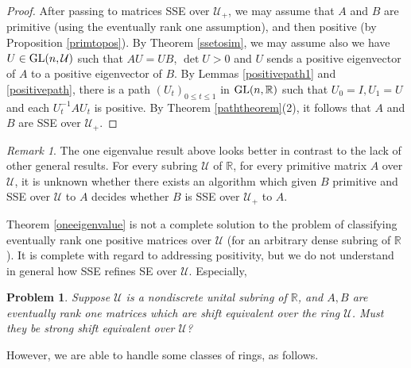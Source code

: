 \documentclass{amsart}
\newtheorem{problem}[theorem]{Problem}
\theoremstyle{definition}
\theoremstyle{remark}
\newtheorem{remark}[theorem]{Remark}
\numberwithin{equation}{section}
\begin{document}
{{\begin{proof}
After passing to matrices SSE over $\mathcal U_+$, 
we may assume that $A$ and $B$ are 
primitive (using the eventually rank one assumption),  
and then positive (by 
 Proposition \ref{primtopos}). By Theorem \ref{ssetosim}, 
we may assume also we have $U\in \textnormal{GL}(n,\mathcal U)$ 
such that $AU=UB$, $\det U>0$ and $U$ sends a positive 
eigenvector of $A$ to a positive eigenvector of $B$. 
By Lemmas \ref{positivepath1} and \ref{positivepath}, 
there is a path $( U_t)_{0\leq t\leq 1}$
in $\textnormal{GL}(n,\mathbb R)$ such that 
$U_0=I, U_1=U$ and each $U_t^{-1}AU_t$ is positive. 
By Theorem \ref{paththeorem}(2), it follows that 
$A$ and $B$ are SSE over $\mathcal U_+$. 
\end{proof} 

\begin{remark} \label{oneremark} 
The one eigenvalue result above looks better in contrast 
to the lack of other general results. 
For every subring $\mathcal U$ of $\mathbb R$, 
for every primitive matrix $A$ over $\mathcal U$, 
it is unknown whether there exists an 
algorithm which given $B$ primitive and 
SSE over $\mathcal U$ to $A$ decides whether 
$B$ is SSE over $\mathcal U_+$ to $A$. 
\end{remark}  

Theorem \ref{oneeigenvalue} is not a complete solution 
to the problem of classifying eventually rank one 
positive matrices 
over $\mathcal U$ (for an arbitrary dense subring of $\mathbb R$).
It is complete with regard to addressing positivity, but  
 we do not understand in general 
 how SSE refines SE 
over $\mathcal U$. Especially, 

\begin{problem}\label{rankonesseproblem} 
Suppose 
$\mathcal U$ is a nondiscrete unital subring of $\mathbb R$, 
 and $A,B$ are eventually rank one matrices which 
are shift equivalent  over the ring 
$\mathcal U$. Must they be strong shift equivalent over
$\mathcal U$?
\end{problem}

However, we are able to handle some classes of rings, as 
follows. 

}}
\end{document}
